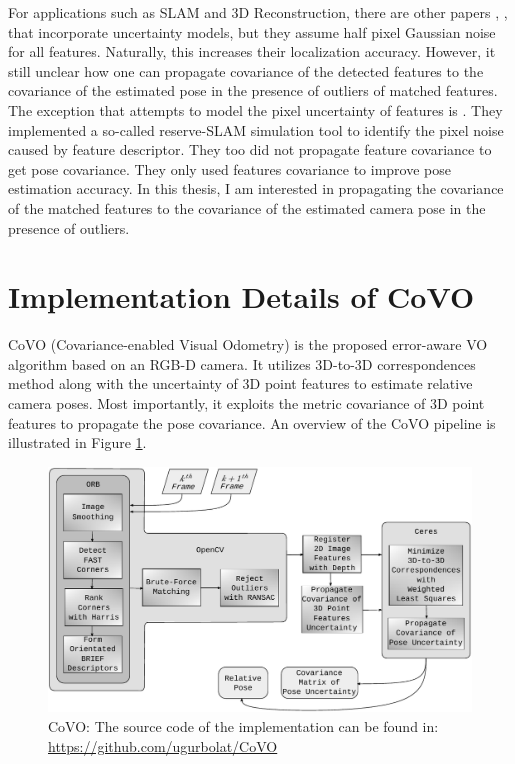 \documentclass[a4paper]{report}
\numberwithin{figure}{section}
\begin{document}
For applications such as SLAM and 3D Reconstruction, there are other papers
\parencite{Endres2014}, \parencite{Konolige08}, \parencite{Di2016a} that 
incorporate
uncertainty models, but they assume half pixel Gaussian noise for all features.
Naturally, this increases their localization accuracy. However, it still
unclear how one can propagate covariance of the detected features to the
covariance of the estimated pose in the presence of outliers of matched
features.  The exception that attempts to model the pixel uncertainty of
features is \parencite{Belter2018a}.  They implemented a so-called reserve-SLAM
simulation tool to identify the pixel noise caused by feature descriptor.  They
too did not propagate feature covariance to get pose covariance.  They only
used features covariance to improve pose estimation accuracy.  In this thesis,
I am interested in propagating the covariance of the matched features to the
covariance of the estimated camera pose in the presence of outliers.

\section{Implementation Details of CoVO}

CoVO (Covariance-enabled Visual Odometry) is the proposed error-aware VO
algorithm based on an RGB-D camera.  It utilizes 3D-to-3D correspondences
method along with the uncertainty of 3D point features to estimate relative
camera poses. Most importantly, it exploits the metric covariance of 3D point
features to propagate the pose covariance.  An overview of the CoVO pipeline is
illustrated in Figure \ref{fig:covo_pipeline}.

\begin{figure}[H] \centering
\includegraphics[width=0.9\linewidth,natwidth=640,natheight=640]
{fig/drawings/covo.pdf} \caption[CoVO Pipeline]{CoVO: The source code of the
implementation can be found in:
\href{https://github.com/ugurbolat/CoVO}{https://github.com/ugurbolat/CoVO}}
\label{fig:covo_pipeline} \end{figure}
\end{document}
